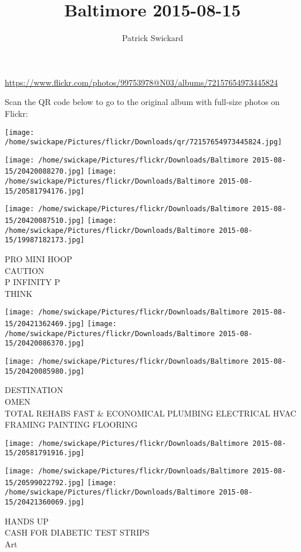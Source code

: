 \documentclass[10pt,letterpaper]{article}
\title{Baltimore 2015-08-15}
\author{Patrick Swickard}
\date{}
\begin{document}
\maketitle

\url{https://www.flickr.com/photos/99753978@N03/albums/72157654973445824}

Scan the QR code below to go to the original album with full-size photos on Flickr:

\texttt{[image: /home/swickape/Pictures/flickr/Downloads/qr/72157654973445824.jpg]}
\pagebreak

\texttt{[image: /home/swickape/Pictures/flickr/Downloads/Baltimore 2015-08-15/20420088270.jpg]}
\texttt{[image: /home/swickape/Pictures/flickr/Downloads/Baltimore 2015-08-15/20581794176.jpg]}

\texttt{[image: /home/swickape/Pictures/flickr/Downloads/Baltimore 2015-08-15/20420087510.jpg]}
\texttt{[image: /home/swickape/Pictures/flickr/Downloads/Baltimore 2015-08-15/19987182173.jpg]}

PRO MINI HOOP\\
CAUTION\\
P INFINITY P\\
THINK
\pagebreak

\texttt{[image: /home/swickape/Pictures/flickr/Downloads/Baltimore 2015-08-15/20421362469.jpg]}
\texttt{[image: /home/swickape/Pictures/flickr/Downloads/Baltimore 2015-08-15/20420086370.jpg]}

\texttt{[image: /home/swickape/Pictures/flickr/Downloads/Baltimore 2015-08-15/20420085980.jpg]}

DESTINATION\\
OMEN\\
TOTAL REHABS FAST \& ECONOMICAL PLUMBING ELECTRICAL HVAC FRAMING PAINTING FLOORING
\pagebreak

\texttt{[image: /home/swickape/Pictures/flickr/Downloads/Baltimore 2015-08-15/20581791916.jpg]}

\vspace{0.25in}
\texttt{[image: /home/swickape/Pictures/flickr/Downloads/Baltimore 2015-08-15/20599022792.jpg]}
\texttt{[image: /home/swickape/Pictures/flickr/Downloads/Baltimore 2015-08-15/20421360069.jpg]}

HANDS UP\\
CASH FOR DIABETIC TEST STRIPS\\
Art
\pagebreak
\end{document}
